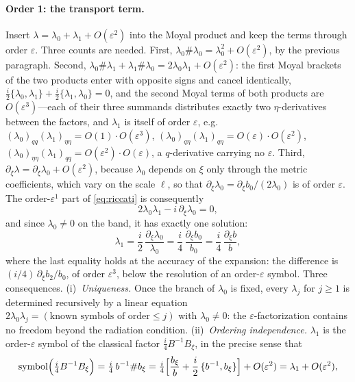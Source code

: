 \documentclass[11pt]{article}
\newcommand{\pd}{\partial}
\begin{document}
\paragraph{Order 1: the transport term.} Insert
$\lambda=\lambda_0+\lambda_1+O(\varepsilon^2)$ into the Moyal product and
keep the terms through order $\varepsilon$. Three counts are needed.
First, $\lambda_0\#\lambda_0=\lambda_0^2+O(\varepsilon^2)$, by the
previous paragraph. Second,
$\lambda_0\#\lambda_1+\lambda_1\#\lambda_0
=2\lambda_0\lambda_1+O(\varepsilon^2)$: the first Moyal brackets of the two
products enter with opposite signs and cancel identically,
$\tfrac i2\{\lambda_0,\lambda_1\}+\tfrac i2\{\lambda_1,\lambda_0\}=0$, and
the second Moyal terms of both products are $O(\varepsilon^3)$---each of
their three summands distributes exactly two $\eta$-derivatives between the
factors, and $\lambda_1$ is itself of order $\varepsilon$, e.g.\
$(\lambda_0)_{qq}(\lambda_1)_{\eta\eta}=O(1)\cdot O(\varepsilon^3)$,
$(\lambda_0)_{q\eta}(\lambda_1)_{q\eta}
=O(\varepsilon)\cdot O(\varepsilon^2)$,
$(\lambda_0)_{\eta\eta}(\lambda_1)_{qq}
=O(\varepsilon^2)\cdot O(\varepsilon)$, a $q$-derivative carrying no
$\varepsilon$. Third, $\pd_\xi\lambda=\pd_\xi\lambda_0+O(\varepsilon^2)$,
because
$\lambda_0$ depends on $\xi$ only through the metric coefficients, which
vary on the scale $\ell$, so that $\pd_\xi\lambda_0
=\pd_\xi b_0/(2\lambda_0)$ is of order $\varepsilon$. The
order-$\varepsilon^1$ part of \eqref{eq:riccati} is consequently
\[
2\lambda_0\lambda_1-i\,\pd_\xi\lambda_0=0 ,
\]
and since $\lambda_0\neq0$ on the band, it has exactly one solution:
\begin{equation}\label{eq:lambda1}
\lambda_1=\frac i2\,\frac{\pd_\xi\lambda_0}{\lambda_0}
=\frac i4\,\frac{\pd_\xi b_0}{b_0}
=\frac i4\,\frac{\pd_\xi b}{b} ,
\end{equation}
where the last equality holds at the accuracy of the expansion: the
difference is $(i/4)\,\pd_\xi b_2/b_0$, of order $\varepsilon^3$, below the
resolution of an order-$\varepsilon$ symbol. Three consequences.
(i)~\emph{Uniqueness.} Once the branch of $\lambda_0$ is fixed, every
$\lambda_j$ for $j\ge1$ is determined recursively by a linear equation
$2\lambda_0\lambda_j=(\text{known symbols of order}\le j)$ with
$\lambda_0\neq0$: the $\varepsilon$-factorization contains no freedom
beyond the radiation condition. (ii)~\emph{Ordering independence.}
$\lambda_1$ is the order-$\varepsilon$ symbol of the classical factor
$\tfrac i4B^{-1}B_\xi$, in the precise sense that
\[
\operatorname{symbol}\Bigl(\tfrac i4B^{-1}B_\xi\Bigr)
=\tfrac i4\,b^{-1}\# b_\xi
=\tfrac i4\Bigl[\frac{b_\xi}{b}
+\frac i2\,\{b^{-1},b_\xi\}\Bigr]+O(\varepsilon^2)
=\lambda_1+O(\varepsilon^2),
\]
\end{document}
